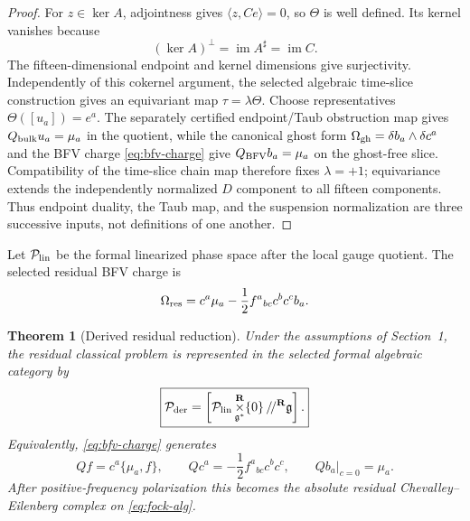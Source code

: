 \documentclass[11pt]{article}
\newtheorem{theorem}{Theorem}[section]
\theoremstyle{remark}
\newcommand{\g}{\mathfrak g}
\newcommand{\im}{\operatorname{im}}
\begin{document}
\begin{proof}
For $z\in\ker A$, adjointness gives $\langle z,Ce\rangle=0$, so $\Theta$
is well defined.  Its kernel vanishes because
\begin{equation*}
 (\ker A)^\perp=\im A^\sharp=\im C.
\end{equation*}
The fifteen-dimensional endpoint and kernel dimensions give surjectivity.
Independently of this cokernel argument, the selected algebraic time-slice
construction gives an equivariant map $\tau=\lambda\Theta$.  Choose representatives
$\Theta([u_a])=e^a$.  The separately certified endpoint/Taub obstruction map
gives $Q_{\rm bulk}u_a=\mu_a$ in the quotient, while the canonical ghost form
$\Omega_{\rm gh}=\delta b_a\wedge\delta c^a$ and the BFV charge
\eqref{eq:bfv-charge} give $Q_{\rm BFV}b_a=\mu_a$ on the ghost-free slice.
Compatibility of the time-slice chain map therefore fixes $\lambda=+1$;
equivariance extends the independently normalized $D$ component to all
fifteen components.  Thus endpoint duality, the Taub map, and the suspension
normalization are three successive inputs, not definitions of one another.
\end{proof}

Let $\mathcal P_{\rm lin}$ be the formal linearized phase space after the
local gauge quotient.  The selected residual BFV charge is
\begin{equation}\label{eq:bfv-charge}
 \Omega_{\rm res}
 =c^a\mu_a-\frac12f^a{}_{bc}c^bc^cb_a.
\end{equation}

\begin{theorem}[Derived residual reduction]\label{thm:derived}
Under the assumptions of Section~1, the residual classical problem is
represented in the selected formal algebraic category by
\begin{equation}\label{eq:derived}
 \boxed{
 \mathcal P_{\rm der}
 =\left[\mathcal P_{\rm lin}
 \mathop{\times}^{\mathbf R}_{\g^*}\{0\}\,/\!/^{\mathbf R}\g\right].}
\end{equation}
Equivalently, \eqref{eq:bfv-charge} generates
\begin{equation}\label{eq:bfv-differential}
 Qf=c^a\{\mu_a,f\},\qquad
 Qc^a=-\frac12f^a{}_{bc}c^bc^c,
 \qquad Qb_a\big|_{c=0}=\mu_a.
\end{equation}
After positive-frequency polarization this becomes the absolute residual
Chevalley--Eilenberg complex on \eqref{eq:fock-alg}.
\end{theorem}
\end{document}
